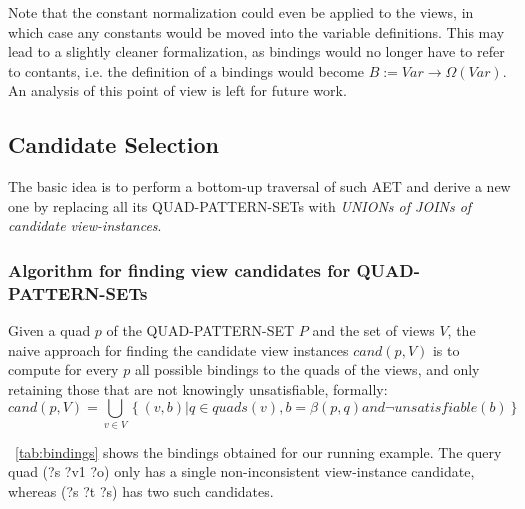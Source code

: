 \documentclass[a4paper,twoside,bibtotoc,abstracton,12pt,BCOR=15mm]{scrreprt}
\begin{document}
Note that the constant normalization could even be applied to the views, in which case any constants would be moved into the variable definitions.
This may lead to a slightly cleaner formalization, as bindings would no longer have to refer to contants, i.e. the definition of a
bindings would become $B := Var \rightarrow  \Omega{ \left ( Var \right ) }$.
An analysis of this point of view is left for future work.  


\subsection{Candidate Selection}
The basic idea is to perform a bottom-up traversal of such AET and derive a new one by replacing all its QUAD-PATTERN-SETs with \emph{UNIONs of JOINs of candidate view-instances}.


\subsubsection{Algorithm for finding view candidates for QUAD-PATTERN-SETs}
\label{alg:canditate-finding}

Given a quad $p$ of the QUAD-PATTERN-SET $P$ and the set of views $V$, the naive approach for finding the candidate view instances $cand(p, V)$ is 
to compute for every $p$ all possible bindings to the quads of the views, and only retaining those that are not knowingly unsatisfiable, formally:
\begin{equation}\label{eq:candidate-set}
cand(p, V) = \bigcup_{v \in V} \left \{ (v, b) | q \in quads(v), b = \beta(p, q) and \lnot unsatisfiable(b) \right \}
\end{equation} 

~\autoref{tab:bindings} shows the bindings obtained for our running example. The query quad (?s ?v1 ?o) only has a single
non-inconsistent view-instance candidate, whereas (?s ?t ?s) has two such candidates.
\end{document}
